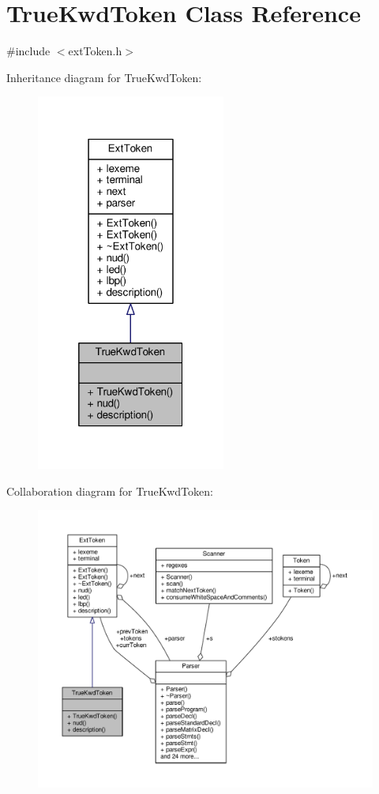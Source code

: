 \hypertarget{classTrueKwdToken}{\section{True\-Kwd\-Token Class Reference}
\label{classTrueKwdToken}
}


{\ttfamily \#include $<$ext\-Token.\-h$>$}



Inheritance diagram for True\-Kwd\-Token\-:\nopagebreak
\begin{figure}[H]
\begin{center}
\leavevmode
\includegraphics[width=176pt]{classTrueKwdToken__inherit__graph}
\end{center}
\end{figure}


Collaboration diagram for True\-Kwd\-Token\-:\nopagebreak
\begin{figure}[H]
\begin{center}
\leavevmode
\includegraphics[width=350pt]{classTrueKwdToken__coll__graph}
\end{center}
\end{figure}
